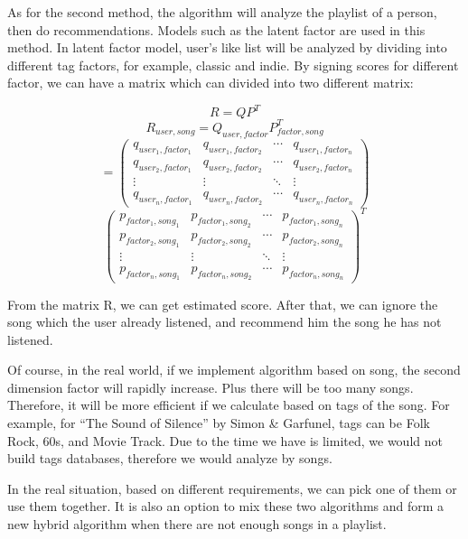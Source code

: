 \documentclass[]{article}
\begin{document}
As for the second method, the algorithm will analyze the playlist of a
person, then do recommendations. Models such as the latent factor are
used in this method. In latent factor model, user's like list will be
analyzed by dividing into different tag factors, for example, classic
and indie. By signing scores for different factor, we can have a matrix
which can divided into two different matrix:

\[R = QP^T\] \[R_{user,song}= Q_{user,factor} P^T_{factor,song}\] \[=
\begin{pmatrix}
  q_{user_{1},factor_{1}} & q_{user_{1},factor_{2}} & \cdots & q_{user_{1},factor_{n}} \\
  q_{user_{2},factor_{1}} & q_{user_{2},factor_{2}} & \cdots & q_{user_{2},factor_{n}} \\
  \vdots  & \vdots  & \ddots & \vdots \\
  q_{user_{n},factor_{1}} & q_{user_{n},factor_{2}} & \cdots & q_{user_{n},factor_{n}}
  \end{pmatrix}\] \[
  \begin{pmatrix}
  p_{factor_{1},song_{1}} & p_{factor_{1},song_{2}} & \cdots & p_{factor_{1},song_{n}} \\
  p_{factor_{2},song_{1}} & p_{factor_{2},song_{2}} & \cdots & p_{factor_{2},song_{n}} \\
  \vdots  & \vdots  & \ddots & \vdots \\
  p_{factor_{n},song_{1}} & p_{factor_{n},song_{2}} & \cdots & p_{factor_{n},song_{n}}
  \end{pmatrix}^T\]

From the matrix R, we can get estimated score. After that, we can ignore
the song which the user already listened, and recommend him the song he
has not listened.

Of course, in the real world, if we implement algorithm based on song,
the second dimension factor will rapidly increase. Plus there will be
too many songs. Therefore, it will be more efficient if we calculate
based on tags of the song. For example, for ``The Sound of Silence'' by
Simon \& Garfunel, tags can be Folk Rock, 60s, and Movie Track. Due to
the time we have is limited, we would not build tags databases,
therefore we would analyze by songs.

In the real situation, based on different requirements, we can pick one
of them or use them together. It is also an option to mix these two
algorithms and form a new hybrid algorithm when there are not enough
songs in a playlist.
\end{document}
